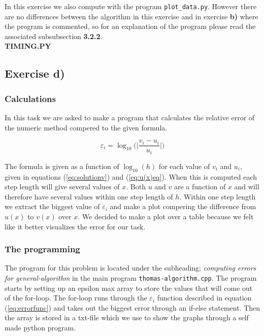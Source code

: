 \documentclass{article}
\begin{document}
    In this exercise we also compute with the program \texttt{plot\_data.py}. However there are no differences between the algorithm in this exercise and in exercise \textbf{b)} where the program is commented, so for an explanation of the program please read the associated subsubsection \textbf{3.2.2}. \\

    {\large  \bf TIMING.PY}


\subsection{Exercise d)}


  \subsubsection{Calculations}

    In this task we are asked to make a program that calculates the relative error of the numeric method compered to the given formula.

    \begin{equation}
      \varepsilon_i = \log_{10} \bigg( \bigg| \frac{v_i - u_i}{u_i} \bigg| \bigg)    \label{eq:errorfunc}
    \end{equation}

    The formula is given as a function of $\log_{10}(h)$ for each value of $v_i$ and $u_i$, given in equations (\ref{eq:solutionv}) and (\ref{eq:u(x)eq}). When this is computed each step length will give several values of $x$. Both $u$ and $v$ are a function of $x$ and will therefore have several values within one step length of $h$. Within one step length we extract the biggest value of $\varepsilon_i$ and make a plot compering the difference from $u(x)$ to $v(x)$ over $x$. We decided to make a plot over a table because we felt like it better visualizes the error for our task.


  \subsubsection{The programming}

    The program for this problem is located under the subheading; \textit{computing errors for general-algorithm} in the main program \texttt{thomas-algorithm.cpp}. The program starts by setting up an epsilon max array to store the values that will come out of the for-loop. The for-loop runs through the $\varepsilon_i$ function described in equation (\ref{eq:errorfunc}) and takes out the biggest error through an if-else statement. Then the array is stored in a txt-file which we use to show the graphs through a self made python program. \\
\end{document}
